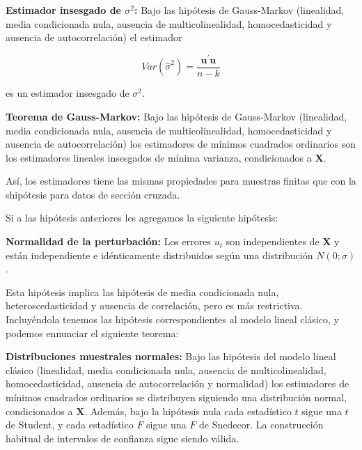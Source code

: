 \begin{teorema}
\textbf{Estimador insesgado de $\sigma^2$:} Bajo las hip\'otesis de Gauss-Markov (linealidad, media condicionada nula, ausencia de multicolinealidad, homocedasticidad y ausencia de autocorrelaci\'on) el estimador

\[Var(\hat{\sigma}^2)=\dfrac{\boldsymbol{u}^{\prime}\boldsymbol{u}}{n-k}\]

es un estimador insesgado de $\sigma^2$.

\end{teorema}

\begin{teorema}
\textbf{Teorema de Gauss-Markov:} Bajo las hip\'otesis de Gauss-Markov (linealidad, media condicionada nula, ausencia de multicolinealidad, homocedasticidad y ausencia de autocorrelaci\'on) los estimadores de m\'inimos cuadrados ordinarios son los estimadores lineales insesgados de m\'inima varianza, condicionados a $\boldsymbol{X}$.

\end{teorema}

As\'i, los estimadores tiene las mismas propiedades para muestras finitas que con la ship\'otesis para datos de secci\'on cruzada.


Si a las hip\'otesis anteriores les agregamos la siguiente hip\'otesis:

\begin{hipotesis}
\textbf{Normalidad de la perturbaci\'on:} Los errores $u_t$ son independientes de $\boldsymbol{X}$ y est\'an independiente e id\'enticamente distribuidos seg\'un una distribuci\'on $N(0;\sigma)$.
\end{hipotesis}

Esta hip\'otesis implica las hip\'otesis de media condicionada nula, heteroscedasticidad y ausencia de correlaci\'on, pero es m\'as restrictiva. Incluy\'endola tenemos las hip\'otesis correspondientes al modelo lineal cl\'asico, y podemos ennunciar el siguiente teorema:

\begin{teorema}
\textbf{Distribuciones muestrales normales:} Bajo las hip\'otesis del modelo lineal cl\'asico (linealidad, media condicionada nula, ausencia de multicolinealidad, homocedasticidad, ausencia de autocorrelaci\'on y normalidad) los estimadores de m\'inimos cuadrados ordinarios se distribuyen siguiendo una distribuci\'on normal, condicionados a $\boldsymbol{X}$. Adem\'as, bajo la hip\'otesis nula cada estad\'istico $t$ sigue una $t$ de Student, y cada estad\'istico $F$ sigue una $F$ de Snedecor. La construcci\'on habitual de intervalos de confianza sigue siendo v\'alida.
\end{teorema}

